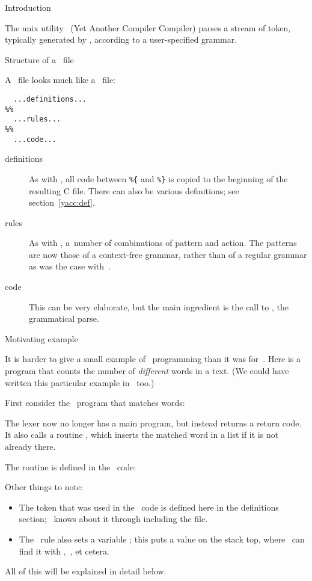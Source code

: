  {Introduction}

The unix utility \yacc\ (Yet Another Compiler Compiler) parses a
stream of token, typically generated by \lex, according to a
user-specified grammar.

 {Structure of a \yacc\ file}

A \yacc\ file looks much like a \lex\ file:
\begin{verbatim}
  ...definitions...
%%
  ...rules...
%%
  ...code...
\end{verbatim}

\begin{description}
\item[definitions] As with \lex, all code between \verb+%{+ and \verb+%}+
 is copied to the beginning of the resulting C file. There can also be
 various definitions; see section~\ref{yacc:def}.
\item[rules] As with \lex, a~number of combinations of pattern and
  action. The patterns are now those of a context-free grammar, rather
  than of a regular grammar as was the case with~\lex.
\item[code] This can be very elaborate, but the main ingredient is the
  call to , the grammatical parse.
\end{description}

 {Motivating example}

It is harder to give a small example of \yacc\ programming than it was
for~\lex. Here is a program that counts the number of \emph{different}
words in a text. (We could have written this particular example in
\lex\ too.)

First consider the \lex\ program that matches words:

The lexer now no longer has a main program, but instead returns a
 return code. It also calls a routine , which
inserts the matched word in a list if it is not already there.

The routine  is defined in the \yacc\ code:

Other things to note:
\begin{itemize}
\item The  token that was used in the \lex\ code is defined
  here in the definitions section; \lex\ knows about it through
  including the  file.
\item The \lex\ rule also sets a variable ; this puts a
  value on the stack top, where \yacc\ can find it with
  ,~, et cetera.
\end{itemize}
All of this will be explained in detail below.

